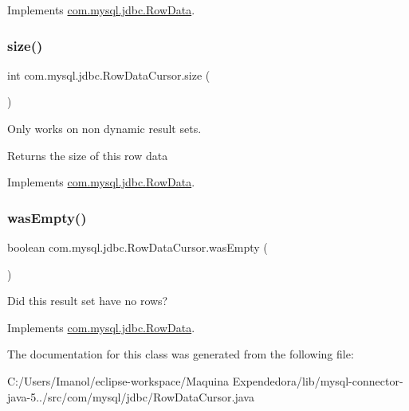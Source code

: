 Implements \mbox{\hyperlink{interfacecom_1_1mysql_1_1jdbc_1_1_row_data_ad2c7f5220e0bd60681453d3d294607cc}{com.\+mysql.\+jdbc.\+Row\+Data}}.

\mbox{\label{classcom_1_1mysql_1_1jdbc_1_1_row_data_cursor_ad597fd5a0264701684a13303c49b13b6}} 
\subsubsection{\texorpdfstring{size()}{size()}}
{\footnotesize\ttfamily int com.\+mysql.\+jdbc.\+Row\+Data\+Cursor.\+size (\begin{DoxyParamCaption}{ }\end{DoxyParamCaption})}

Only works on non dynamic result sets.

\begin{DoxyReturn}{Returns}
the size of this row data 
\end{DoxyReturn}


Implements \mbox{\hyperlink{interfacecom_1_1mysql_1_1jdbc_1_1_row_data_a7c6f91ddc0fcd7f5f12a64c7dc019995}{com.\+mysql.\+jdbc.\+Row\+Data}}.

\mbox{\label{classcom_1_1mysql_1_1jdbc_1_1_row_data_cursor_a1a7ddb6250de847e90a2146a01ab0f46}} 
\subsubsection{\texorpdfstring{was\+Empty()}{wasEmpty()}}
{\footnotesize\ttfamily boolean com.\+mysql.\+jdbc.\+Row\+Data\+Cursor.\+was\+Empty (\begin{DoxyParamCaption}{ }\end{DoxyParamCaption})}

Did this result set have no rows? 

Implements \mbox{\hyperlink{interfacecom_1_1mysql_1_1jdbc_1_1_row_data_a27df2f8d51aad5e69a5ac330a7b70aac}{com.\+mysql.\+jdbc.\+Row\+Data}}.



The documentation for this class was generated from the following file\+:\begin{DoxyCompactItemize}
\item 
C\+:/\+Users/\+Imanol/eclipse-\/workspace/\+Maquina Expendedora/lib/mysql-\/connector-\/java-\/5../src/com/mysql/jdbc/Row\+Data\+Cursor.\+java\end{DoxyCompactItemize}
